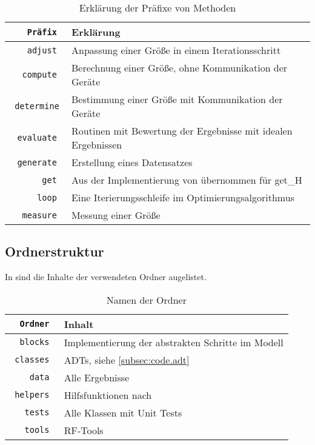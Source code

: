 \documentclass[../Report.tex]{subfiles}
\begin{document}
\begin{table}[H]
\centering 
\begin{tabular}[t]{| >{\texttt\bgroup}r<{\egroup} | l |} 
  \hline
    \textrm{\textbf{Präfix}} & \textbf{Erklärung} \\ 
  \hline \hline
    adjust & Anpassung einer Größe in einem Iterationsschritt	\\
  \hline
    compute & Berechnung einer Größe, ohne Kommunikation der Geräte \\ 
  \hline
    determine & Bestimmung einer Größe mit Kommunikation der Geräte 	\\
  \hline 
    evaluate & Routinen mit Bewertung der Ergebnisse mit idealen Ergebnissen \\  
  \hline 
    generate & Erstellung eines Datensatzes \\
  \hline
    get & Aus der Implementierung von \cite{PJS_Denys} übernommen für get\_H \\
  \hline
    loop & Eine Iterierungsschleife im Optimierungsalgorithmus \\  
  \hline  
    measure & Messung einer Größe \\  
  \hline
\end{tabular}
\caption{Erklärung der Präfixe von Methoden}
\label{tab:code.namen}
\end{table}

\subsection*{Ordnerstruktur}
\label{subsec:code.ordner}
In  sind die Inhalte der verwendeten Ordner augelistet.

\begin{table}[H]
\centering 
\begin{tabular}[t]{| >{\texttt\bgroup}r<{\egroup} | l |} 
  \hline
    \textrm{\textbf{Ordner}} & \textbf{Inhalt} \\ 
  \hline \hline
    blocks & Implementierung der abstrakten Schritte im Modell	\\
  \hline  
    classes & ADTs, siehe \ref{subsec:code.adt} \\  
  \hline
    data & Alle Ergebnisse \\ 
  \hline
    helpers & Hilfsfunktionen nach \cite{helper_class} 	\\
  \hline 
    tests & Alle Klassen mit Unit Tests \\  
  \hline 
    tools & RF-Tools \\ 
  \hline
\end{tabular}
\caption{Namen der Ordner}
\label{tab:code.ordner}
\end{table}
\end{document}
